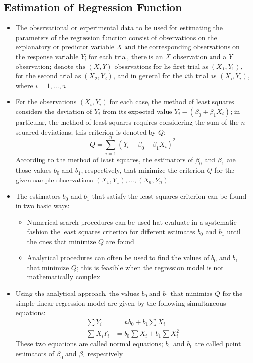 \subsection{Estimation of Regression Function}
\begin{itemize}
\item The observational or experimental data to be used for estimating the parameters of the regression function consist of observations on the explanatory or predictor variable $X$ and the corresponding observations on the response variable $Y$; for each trial, there is an $X$ observation and a $Y$ observation; denote the $(X,Y)$ observations for he first trial as $(X_1,Y_1)$, for the second trial as $(X_2,Y_2)$, and in general for the $i$th trial as $(X_i, Y_i)$, where $i=1,\dots,n$
\item For the observations $(X_i, Y_i)$ for each case, the method of least squares considers the deviation of $Y_i$ from its expected value $Y_i - (\beta_0 + \beta_1X_i)$; in particular, the method of least squares requires considering the sum of the $n$ squared deviations; this criterion is denoted by $Q$: $$ Q = \sum_{i=1}^n (Y_i - \beta_0 - \beta_1X_i)^2 $$ 
According to the method of least squares, the estimators of $\beta_0$ and $\beta_1$ are those values $b_0$ and $b_1$, respectively, that minimize the criterion $Q$ for the given sample observations $(X_1,Y_1),\dots, (X_n,Y_n)$
\item The estimators $b_0$ and $b_1$ that satisfy the least squares criterion can be found in two basic ways: \begin{itemize} 
\item Numerical search procedures can be used hat evaluate in a systematic fashion the least squares criterion for different estimates $b_0$ and $b_1$ until the ones that minimize $Q$ are found
\item Analytical procedures can often be used to find the values of $b_0$ and $b_1$ that minimize $Q$; this is feasible when the regression model is not mathematically complex \end{itemize}
\item Using the analytical approach, the values $b_0$ and $b_1$ that minimize $Q$ for the simple linear regression model  are given by the following simultaneous equations: $$ \begin{aligned} 
\sum Y_i &= nb_0 + b_1\sum X_i \\ \sum X_i Y_i &= b_0\sum X_i + b_1\sum X_i^2 \end{aligned} $$ 
These two equations are called normal equations; $b_0$ and $b_1$ are called point estimators of $\beta_0$ and $\beta_1$ respectively

\end{itemize}
